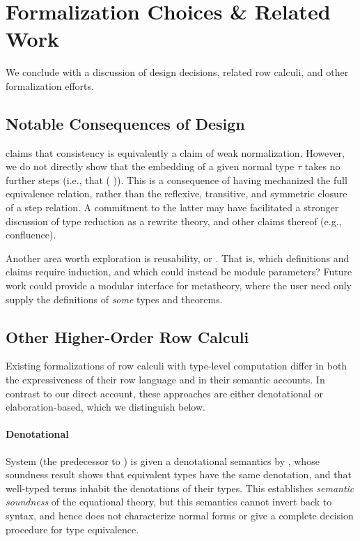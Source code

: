\documentclass[sigplan,screen]{acmart}
\newif\ifrelatedWork\relatedWorktrue
\begin{document}

\section{Formalization Choices \& Related Work}
\label{sec:related-work}
\ifrelatedWork

We conclude with a discussion of design decisions, related row calculi, and other formalization efforts.

\subsection{Notable Consequences of Design}
 claims that consistency is equivalently a claim of weak normalization. However, we do not directly show that the embedding of a given normal type $\tau$ takes no further steps (i.e., that  \Function{∃[}  \Function{]} (   )). This is a consequence of having mechanized the full equivalence relation, rather than the reflexive, transitive, and symmetric closure of a step relation. A commitment to the latter may have facilitated a stronger discussion of type reduction as a rewrite theory, and other claims thereof (e.g., confluence). 

Another area worth exploration is reusability, \ala{} \citet{AllaisACMM21} or \citet{Saffrich24}. That is, which definitions and claims require induction, and which could instead be module parameters? Future work could provide a modular interface for metatheory, where the user need only supply the definitions of \emph{some} types and theorems.

\subsection{Other Higher-Order Row Calculi}

Existing formalizations of row calculi with type-level computation differ in both the expressiveness of their row language and in their semantic accounts. In contrast to our direct account, these approaches are either denotational or elaboration-based, which we distinguish below.

\paragraph{Denotational} System \RO{} (the predecessor to \Rome) is given a denotational semantics by , whose soundness result shows that equivalent types have the same denotation, and that well-typed terms inhabit the denotations of their types. This establishes \emph{semantic soundness} of the equational theory, but this semantics cannot invert back to syntax, and hence does not characterize normal forms or give a complete decision procedure for type equivalence.
\end{document}
